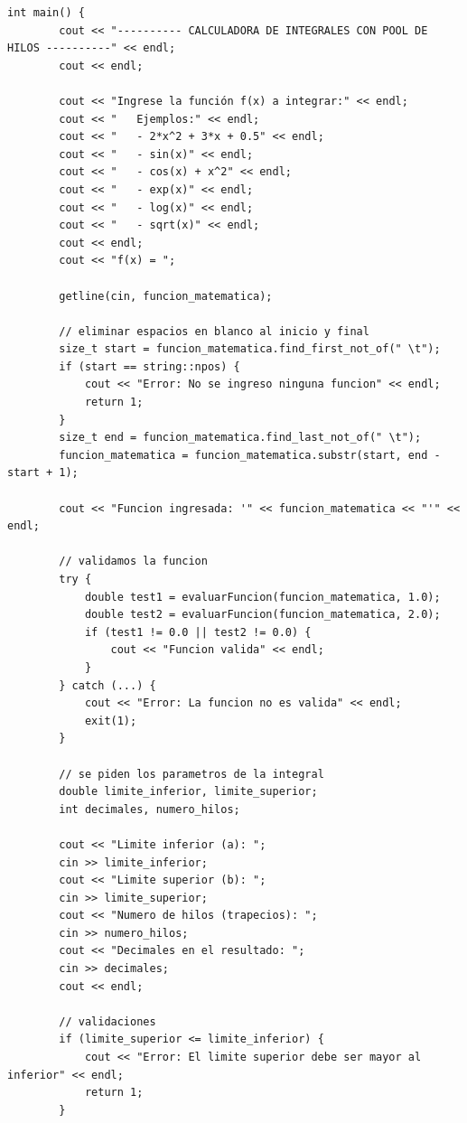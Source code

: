 \begin{lstlisting}[style=cpp-style, caption={Función Main en TrapecioPool.cpp }]
    int main() {
        cout << "---------- CALCULADORA DE INTEGRALES CON POOL DE HILOS ----------" << endl;
        cout << endl;
        
        cout << "Ingrese la función f(x) a integrar:" << endl;
        cout << "   Ejemplos:" << endl;
        cout << "   - 2*x^2 + 3*x + 0.5" << endl;
        cout << "   - sin(x)" << endl;
        cout << "   - cos(x) + x^2" << endl;
        cout << "   - exp(x)" << endl;
        cout << "   - log(x)" << endl;
        cout << "   - sqrt(x)" << endl;
        cout << endl;
        cout << "f(x) = ";
        
        getline(cin, funcion_matematica);
        
        // eliminar espacios en blanco al inicio y final
        size_t start = funcion_matematica.find_first_not_of(" \t");
        if (start == string::npos) {
            cout << "Error: No se ingreso ninguna funcion" << endl;
            return 1;
        }
        size_t end = funcion_matematica.find_last_not_of(" \t");
        funcion_matematica = funcion_matematica.substr(start, end - start + 1);
    
        cout << "Funcion ingresada: '" << funcion_matematica << "'" << endl;
    
        // validamos la funcion 
        try {
            double test1 = evaluarFuncion(funcion_matematica, 1.0);
            double test2 = evaluarFuncion(funcion_matematica, 2.0);
            if (test1 != 0.0 || test2 != 0.0) {
                cout << "Funcion valida" << endl;
            }
        } catch (...) {
            cout << "Error: La funcion no es valida" << endl;
            exit(1);
        }
        
        // se piden los parametros de la integral
        double limite_inferior, limite_superior;
        int decimales, numero_hilos;
        
        cout << "Limite inferior (a): ";
        cin >> limite_inferior;
        cout << "Limite superior (b): ";
        cin >> limite_superior;
        cout << "Numero de hilos (trapecios): ";
        cin >> numero_hilos;
        cout << "Decimales en el resultado: ";
        cin >> decimales;
        cout << endl;
        
        // validaciones
        if (limite_superior <= limite_inferior) {
            cout << "Error: El limite superior debe ser mayor al inferior" << endl;
            return 1;
        }
        

\end{lstlisting}
